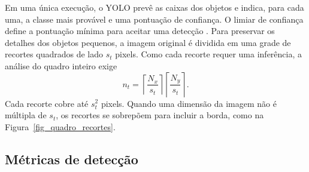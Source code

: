 Em uma única execução, o YOLO prevê as caixas dos objetos e indica, para cada uma, a classe mais provável e uma pontuação de confiança. O limiar de confiança define a pontuação mínima para aceitar uma detecção \cite{redmon2016yolo,jocher2024yolo11}. Para preservar os detalhes dos objetos pequenos, a imagem original é dividida em uma grade de recortes quadrados de lado $s_t$ pixels. Como cada recorte requer uma inferência, a análise do quadro inteiro exige
\begin{equation}
  n_t = \left\lceil \frac{N_x}{s_t} \right\rceil \left\lceil \frac{N_y}{s_t} \right\rceil.
  \label{eq_recortes}
\end{equation}
Cada recorte cobre até $s_t^2$ pixels. Quando uma dimensão da imagem não é múltipla de $s_t$, os recortes se sobrepõem para incluir a borda, como na Figura~\ref{fig_quadro_recortes}.

\subsection{Métricas de detecção}

